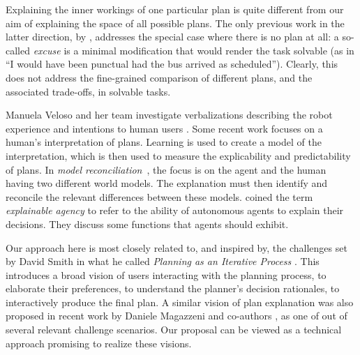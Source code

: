 Explaining the inner workings of one particular plan is quite
different from our aim of explaining the space of all possible
plans. The only previous work in the latter direction, by
\cite{goebelbecker:etal:icaps-10}, addresses the special case where
there is no plan at all: a so-called \emph{excuse} is a minimal
modification that would render the task solvable (as in ``I would have
been punctual had the bus arrived as scheduled''). Clearly, this does
not address the fine-grained comparison of different plans, and the
associated trade-offs, in solvable tasks.

Manuela Veloso and her team investigate verbalizations describing the
robot experience and intentions to human users
\cite{rosenthal:etal:ijcai-16}. Some recent work
\cite{zhang:etal:icra-17} focuses on a human's interpretation of
plans. Learning is used to create a model of the interpretation, which
is then used to measure the explicability and predictability of
plans. In \emph{model
  reconciliation}~\cite{chakraborti:etal:ijcai-17}, the focus is on
the agent and the human having two different world models. The
explanation must then identify and reconcile the relevant differences
between these models. \cite{langley:etal:aaai-17} coined the term
\emph{explainable agency} to refer to the ability of autonomous agents
to explain their decisions. They discuss some functions that agents
should exhibit.

Our approach here is most closely related to, and inspired by, the
challenges set by David Smith in what he called \emph{Planning as an
  Iterative Process} \cite{smith:aaai-12}. This introduces a broad
vision of users interacting with the planning process, to elaborate
their preferences, to understand the planner's decision rationales, to
interactively produce the final plan. A similar vision of plan
explanation was also proposed in recent work by Daniele Magazzeni and
co-authors \cite{fox:etal:ijcai-ws-17}, as one of out of several
relevant challenge scenarios. Our proposal can be viewed as a
technical approach promising to realize these visions.





